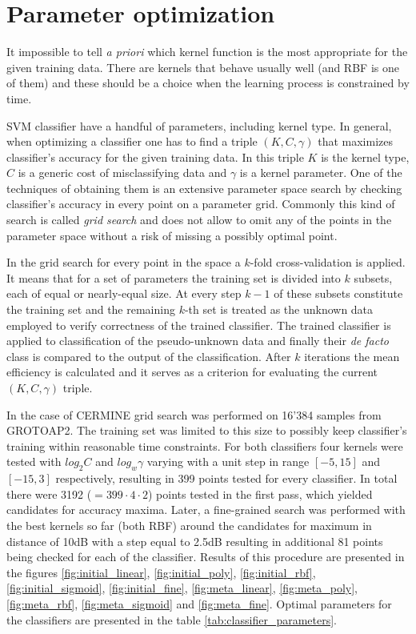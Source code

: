 \section{Parameter optimization}
\label{sec:svm_optimization}
It impossible to tell \textit{a priori} which kernel function is the most appropriate for the given training data. There are kernels that behave usually well (and RBF is one of them) and these should be a choice when the learning process is constrained by time.

SVM classifier have a handful of parameters, including kernel type. In general, when optimizing a classifier one has to find a triple $(K, C, \gamma)$ that maximizes classifier's accuracy for the given training data. In this triple $K$ is the kernel type, $C$ is a generic cost of misclassifying data and $\gamma$ is a kernel parameter. One of the techniques of obtaining them is an extensive parameter space search by checking classifier's accuracy in every point on a parameter grid. Commonly this kind of search is called \textit{grid search} and does not allow to omit any of the points in the parameter space without a risk of missing a possibly optimal point.

In the grid search for every point in the space a $k$-fold cross-validation is applied. It means that for a set of parameters the training set is divided into $k$ subsets, each of equal or nearly-equal size. At every step $k-1$ of these subsets constitute the training set and the remaining $k$-th set is treated as the unknown data employed to verify correctness of the trained classifier. The trained classifier is applied to classification of the pseudo-unknown data and finally their \textit{de facto} class is compared to the output of the classification. After $k$ iterations the mean efficiency is calculated and it serves as a criterion for evaluating the current $(K, C, \gamma)$ triple.


In the case of CERMINE grid search was performed on 16'384 samples from GROTOAP2. The training set was limited to this size to possibly keep classifier's training within reasonable time constraints. For both classifiers four kernels were tested with $log_{2}C$ and $log_{w}\gamma$ varying with a unit step in range $[-5,15]$ and $[-15,3]$ respectively, resulting in 399 points tested for every classifier. In total there were 3192 ($=399\cdot4\cdot2$) points tested in the first pass, which yielded candidates for accuracy maxima. Later, a fine-grained search was performed with the best kernels so far (both RBF) around the candidates for maximum in distance of 10dB with a step equal to 2.5dB resulting in additional 81 points being checked for each of the classifier. Results of this procedure are presented in the figures \ref{fig:initial_linear}, \ref{fig:initial_poly}, \ref{fig:initial_rbf}, \ref{fig:initial_sigmoid}, \ref{fig:initial_fine}, \ref{fig:meta_linear}, \ref{fig:meta_poly}, \ref{fig:meta_rbf}, \ref{fig:meta_sigmoid} and \ref{fig:meta_fine}. Optimal parameters for the classifiers are presented in the table \ref{tab:classifier_parameters}.

